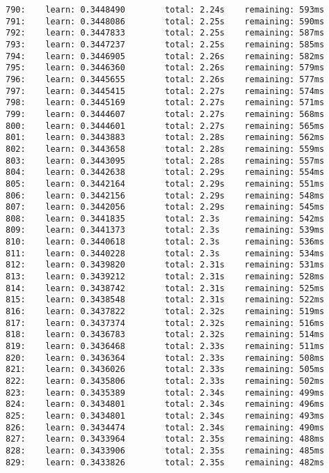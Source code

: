 \documentclass[11pt]{article}
\begin{document}
\begin{Verbatim}[commandchars=\\\{\}]
790:    learn: 0.3448490        total: 2.24s    remaining: 593ms
791:    learn: 0.3448086        total: 2.25s    remaining: 590ms
792:    learn: 0.3447833        total: 2.25s    remaining: 587ms
793:    learn: 0.3447237        total: 2.25s    remaining: 585ms
794:    learn: 0.3446905        total: 2.26s    remaining: 582ms
795:    learn: 0.3446360        total: 2.26s    remaining: 579ms
796:    learn: 0.3445655        total: 2.26s    remaining: 577ms
797:    learn: 0.3445415        total: 2.27s    remaining: 574ms
798:    learn: 0.3445169        total: 2.27s    remaining: 571ms
799:    learn: 0.3444607        total: 2.27s    remaining: 568ms
800:    learn: 0.3444601        total: 2.27s    remaining: 565ms
801:    learn: 0.3443883        total: 2.28s    remaining: 562ms
802:    learn: 0.3443658        total: 2.28s    remaining: 559ms
803:    learn: 0.3443095        total: 2.28s    remaining: 557ms
804:    learn: 0.3442638        total: 2.29s    remaining: 554ms
805:    learn: 0.3442164        total: 2.29s    remaining: 551ms
806:    learn: 0.3442156        total: 2.29s    remaining: 548ms
807:    learn: 0.3442056        total: 2.29s    remaining: 545ms
808:    learn: 0.3441835        total: 2.3s     remaining: 542ms
809:    learn: 0.3441373        total: 2.3s     remaining: 539ms
810:    learn: 0.3440618        total: 2.3s     remaining: 536ms
811:    learn: 0.3440228        total: 2.3s     remaining: 534ms
812:    learn: 0.3439820        total: 2.31s    remaining: 531ms
813:    learn: 0.3439212        total: 2.31s    remaining: 528ms
814:    learn: 0.3438742        total: 2.31s    remaining: 525ms
815:    learn: 0.3438548        total: 2.31s    remaining: 522ms
816:    learn: 0.3437822        total: 2.32s    remaining: 519ms
817:    learn: 0.3437374        total: 2.32s    remaining: 516ms
818:    learn: 0.3436783        total: 2.32s    remaining: 514ms
819:    learn: 0.3436468        total: 2.33s    remaining: 511ms
820:    learn: 0.3436364        total: 2.33s    remaining: 508ms
821:    learn: 0.3436026        total: 2.33s    remaining: 505ms
822:    learn: 0.3435806        total: 2.33s    remaining: 502ms
823:    learn: 0.3435389        total: 2.34s    remaining: 499ms
824:    learn: 0.3434801        total: 2.34s    remaining: 496ms
825:    learn: 0.3434801        total: 2.34s    remaining: 493ms
826:    learn: 0.3434474        total: 2.34s    remaining: 490ms
827:    learn: 0.3433964        total: 2.35s    remaining: 488ms
828:    learn: 0.3433906        total: 2.35s    remaining: 485ms
829:    learn: 0.3433826        total: 2.35s    remaining: 482ms

\end{Verbatim}
\end{document}
